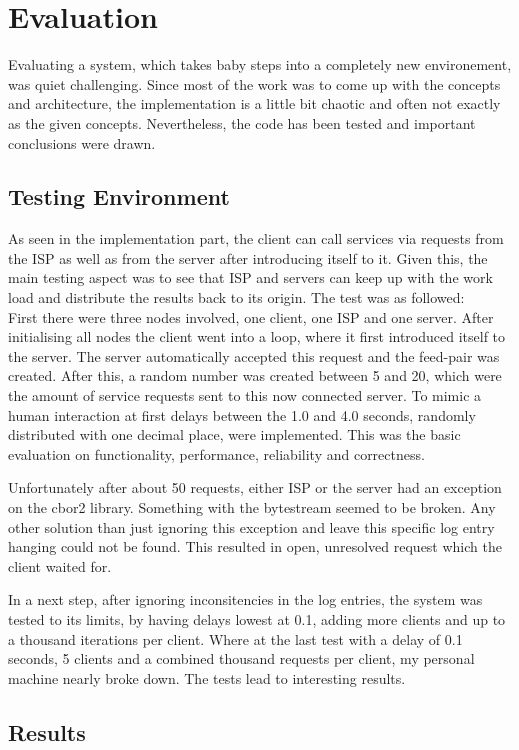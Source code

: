 \chapter{Evaluation}
Evaluating a system, which takes baby steps into a completely new environement, was quiet challenging. Since most of the work was to come up with the concepts and architecture, the implementation is a little bit chaotic and often not exactly as the given concepts. Nevertheless, the code has been tested and important conclusions were drawn.
\section{Testing Environment}
As seen in the implementation part, the client can call services via requests from the ISP as well as from the server after introducing itself to it. Given this, the main testing aspect was to see that ISP and servers can keep up with the work load and distribute the results back to its origin. The test was as followed:\\
First there were three nodes involved, one client, one ISP and one server. After initialising all nodes the client went into a loop, where it first introduced itself to the server. The server automatically accepted this request and the feed-pair was created. After this, a random number was created between 5 and 20, which were the amount of service requests sent to this now connected server. To mimic a human interaction at first delays between the 1.0 and 4.0 seconds, randomly distributed with one decimal place, were implemented. This was the basic evaluation on functionality, performance, reliability and correctness.

Unfortunately after about 50 requests, either ISP or the server had an exception on the cbor2 library. Something with the bytestream seemed to be broken. Any other solution than just ignoring this exception and leave this specific log entry hanging could not be found. This resulted in open, unresolved request which the client waited for.

In a next step, after ignoring inconsitencies in the log entries, the system was tested to its limits, by having delays lowest at 0.1, adding more clients and up to a thousand iterations per client. Where at the last test with a delay of 0.1 seconds, 5 clients and a combined thousand requests per client, my personal machine nearly broke down. The tests lead to interesting results.

\section{Results}
